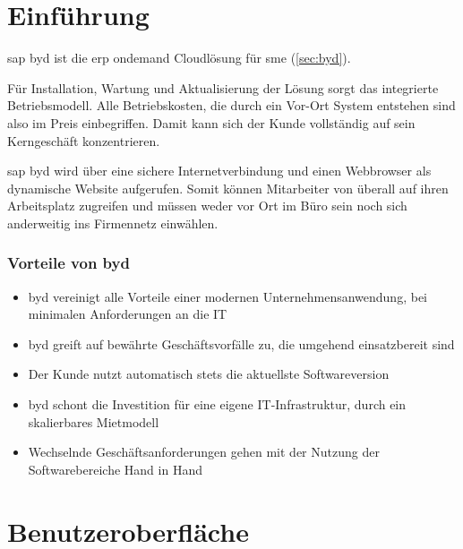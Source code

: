 \section{Einführung}

\gls{sap} \gls{byd} ist die \gls{erp} \gls{ondemand} Cloudlösung für \gls{sme} (\ref{sec:byd}).

Für Installation, Wartung und Aktualisierung der Lösung sorgt das integrierte Betriebsmodell. Alle Betriebskosten, die durch ein Vor-Ort System entstehen sind also im Preis einbegriffen. Damit kann sich der Kunde vollständig auf sein Kerngeschäft konzentrieren.

\gls{sap} \gls{byd} wird über eine sichere Internetverbindung und einen Webbrowser als dynamische Website aufgerufen. Somit können Mitarbeiter von überall auf ihren Arbeitsplatz zugreifen und müssen weder vor Ort im Büro sein noch sich anderweitig ins Firmennetz einwählen.

\subsubsection{Vorteile von \gls{byd}}

\begin{itemize}
\item \gls{byd} vereinigt alle Vorteile einer modernen Unternehmensanwendung, bei minimalen Anforderungen an die IT
\item \gls{byd} greift auf bewährte Geschäftsvorfälle zu, die umgehend einsatzbereit sind
\item Der Kunde nutzt automatisch stets die aktuellste Softwareversion
\item \gls{byd} schont die Investition für eine eigene IT-Infrastruktur, durch ein skalierbares Mietmodell
\item Wechselnde Geschäftsanforderungen gehen mit der Nutzung der Softwarebereiche Hand in Hand
\end{itemize}
\cite{itelligence}

\section{Benutzeroberfläche}

